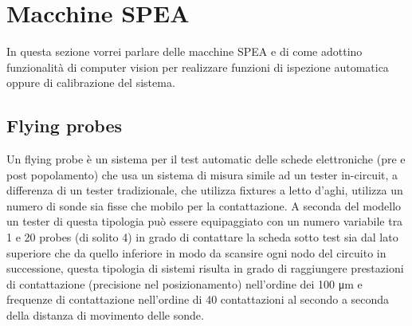 


\section{Macchine SPEA}
In questa sezione vorrei parlare delle macchine SPEA e di come adottino
funzionalità di computer vision per realizzare funzioni di ispezione automatica
oppure di calibrazione del sistema.
\subsection{Flying probes}

		


Un flying probe è un sistema per il test automatic delle schede elettroniche (pre e post popolamento) che 
usa un sistema di misura simile ad un tester in-circuit, a differenza di un tester tradizionale, che utilizza fixtures a letto d’aghi, utilizza un numero di sonde sia fisse che mobilo per la contattazione. 
A seconda del modello un tester di questa tipologia può essere equipaggiato con un numero variabile tra 
1 e 20 probes (di solito 4) in grado di contattare la scheda sotto test sia dal lato superiore che da quello inferiore in modo da scansire ogni nodo del circuito in successione, questa tipologia di sistemi risulta in grado di raggiungere prestazioni di contattazione (precisione nel posizionamento) nell’ordine dei  100 μm e frequenze di contattazione nell’ordine di 40 contattazioni al secondo a seconda della distanza di movimento delle sonde. 

